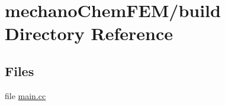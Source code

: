 \section{mechano\+Chem\+F\+E\+M/build Directory Reference}
\label{dir_1c6b873e04307873403067dd366f826b}
\subsection*{Files}
\begin{DoxyCompactItemize}
\item 
file \mbox{\hyperlink{main_8cc}{main.\+cc}}
\end{DoxyCompactItemize}

